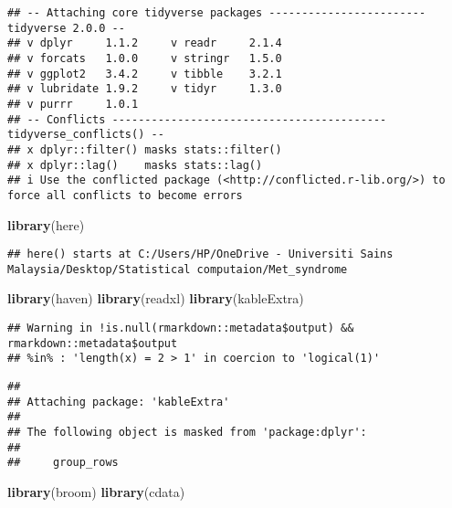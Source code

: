 \documentclass[
]{article}
\newenvironment{Shaded}{\begin{snugshade}}{\end{snugshade}}
\newcommand{\FunctionTok}[1]{\textcolor[rgb]{0.13,0.29,0.53}{\textbf{#1}}}
\newcommand{\NormalTok}[1]{#1}
\begin{document}
\begin{verbatim}
## -- Attaching core tidyverse packages ------------------------ tidyverse 2.0.0 --
## v dplyr     1.1.2     v readr     2.1.4
## v forcats   1.0.0     v stringr   1.5.0
## v ggplot2   3.4.2     v tibble    3.2.1
## v lubridate 1.9.2     v tidyr     1.3.0
## v purrr     1.0.1     
## -- Conflicts ------------------------------------------ tidyverse_conflicts() --
## x dplyr::filter() masks stats::filter()
## x dplyr::lag()    masks stats::lag()
## i Use the conflicted package (<http://conflicted.r-lib.org/>) to force all conflicts to become errors
\end{verbatim}

\begin{Shaded}
\begin{Highlighting}[]
\FunctionTok{library}\NormalTok{(here)}
\end{Highlighting}
\end{Shaded}

\begin{verbatim}
## here() starts at C:/Users/HP/OneDrive - Universiti Sains Malaysia/Desktop/Statistical computaion/Met_syndrome
\end{verbatim}

\begin{Shaded}
\begin{Highlighting}[]
\FunctionTok{library}\NormalTok{(haven)}
\FunctionTok{library}\NormalTok{(readxl)}
\FunctionTok{library}\NormalTok{(kableExtra)}
\end{Highlighting}
\end{Shaded}

\begin{verbatim}
## Warning in !is.null(rmarkdown::metadata$output) && rmarkdown::metadata$output
## %in% : 'length(x) = 2 > 1' in coercion to 'logical(1)'
\end{verbatim}

\begin{verbatim}
## 
## Attaching package: 'kableExtra'
## 
## The following object is masked from 'package:dplyr':
## 
##     group_rows
\end{verbatim}

\begin{Shaded}
\begin{Highlighting}[]
\FunctionTok{library}\NormalTok{(broom)}
\FunctionTok{library}\NormalTok{(cdata)}
\end{Highlighting}
\end{Shaded}
\end{document}
